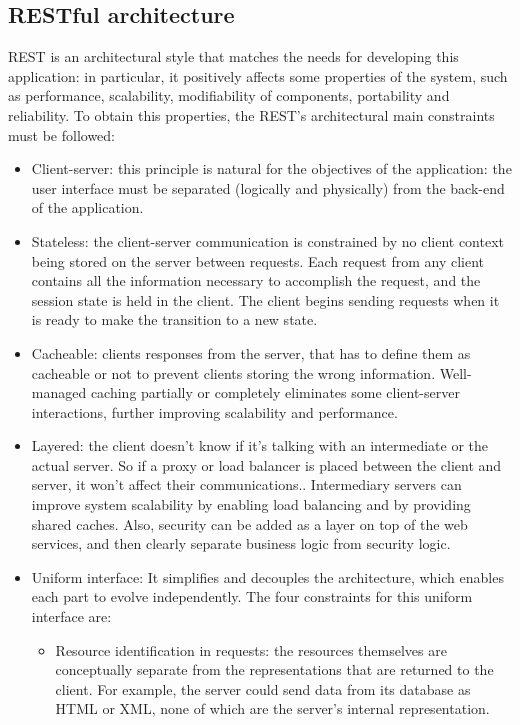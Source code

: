 \documentclass[12pt,a4paper]{report}
\begin{document}
			\subsection{RESTful architecture}
	REST is an architectural style that matches the needs for developing this application: in particular, it positively affects
some properties of the system, such as performance, scalability, modifiability of components, portability and reliability. To obtain this properties, the REST's architectural main constraints must be followed:
\begin{itemize}
	\item{Client-server}: this principle is natural for the objectives of the application: the user interface must be separated (logically and physically) from the back-end of the application.
	\item{Stateless}: the client-server communication is constrained by no client context being stored on the server between requests. Each request from any client contains all the information necessary to accomplish the request, and the session state is held in the client. The client begins sending requests when it is ready to make the transition to a new state.
	\item{Cacheable}: clients  responses from the server, that has to define them as cacheable or not to prevent clients storing the wrong information. Well-managed caching partially or completely eliminates some client-server interactions, further improving scalability and performance.
	\item{Layered}: the client doesn't know if it's talking with an intermediate or the actual server. So if a proxy or load balancer is placed between the client and server, it won't affect their communications.. Intermediary servers can improve system scalability by enabling load balancing and by providing shared caches. Also, security can be added as a layer on top of the web services, and then clearly separate business logic from security logic.
	\item{Uniform interface}: It simplifies and decouples the architecture, which enables each part to evolve independently. The four constraints for this uniform interface are:
	\begin{itemize}
		\item{Resource identification in requests}: the resources themselves are conceptually separate from the representations that are returned to the client. For example, the server could send data from its database as HTML or XML, none of which are the server's internal representation.

\end{itemize}
\end{itemize}
\end{document}
